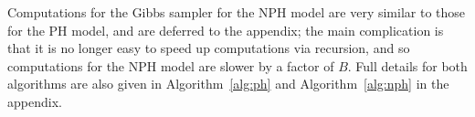 \documentclass[12pt]{article}
\newcommand{\Gam}{\operatorname{Gam}}
\newcommand{\sM}{\mathcal M}
\newcommand{\Tree}{\mathcal T}
\newcommand{\bfX}{{\bf X}}
\begin{document}

Computations for the Gibbs sampler for the NPH model are very similar to those 
for the PH model, and are deferred to the appendix; the main complication is that it is no longer easy to speed up computations via recursion, and so computations for the NPH model are slower by a factor of $B$. Full details for both algorithms are also given in Algorithm~\ref{alg:ph} and Algorithm~\ref{alg:nph} in the appendix.


\end{document}
